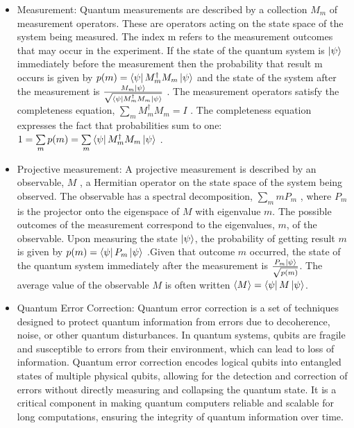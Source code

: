 \documentclass{article}
\begin{document}
\begin{itemize}
			\item Measurement: Quantum measurements are described by a collection ${M_m}$ of measurement operators. These are operators acting on the state space of the  system being measured. The index m refers to the measurement outcomes that may occur in the experiment. If the state of the quantum system is $\ket{\psi}$ immediately before the measurement then the probability that result m occurs is given by $p(m) = \bra{\psi}M_{m}^{\dag}M_{m}\ket{\psi}$ and the state of the system after the measurement is $\frac{M_{m}\ket{\psi}}{\sqrt{\bra{\psi}M_{m}^{\dag}M_{m}\ket{\psi}}}$ . The measurement operators satisfy the completeness equation, $\sum\limits_{m} M_{m}^{\dag}M_{m} = I$ . The completeness equation expresses the fact that probabilities sum to one: $1 = \sum\limits_{m} p(m) = \sum\limits_{m} \bra{\psi}M_{m}^{\dag}M_{m}\ket{\psi}$ . \cite{quantccompquantinfo}
			
			\item Projective measurement: A projective measurement is described by an observable, $M$ , a Hermitian operator on the state space of the system being observed. The observable has a spectral decomposition, $\sum\limits_m mP_m$ , where $P_m$ is the projector onto the eigenspace of $M$ with eigenvalue $m$. The possible outcomes of the measurement correspond to the eigenvalues, $m$, of the observable. Upon measuring the state $\ket{\psi}$, the probability of getting result $m$ is given by $p(m) = \bra{\psi}P_m\ket{\psi}$ .Given that outcome $m$ occurred, the state of the quantum system immediately after the measurement is $\frac{P_m\ket{\psi}}{\sqrt{p(m)}}$. The average value of the observable $M$ is often written $\braket{M} = \bra{\psi}M\ket{\psi}$.\cite{quantccompquantinfo}
			
			\item Quantum Error Correction: Quantum error correction is a set of techniques designed to protect quantum information from errors due to decoherence, noise, or other quantum disturbances. In quantum systems, qubits are fragile and susceptible to errors from their environment, which can lead to loss of information. Quantum error correction encodes logical qubits into entangled states of multiple physical qubits, allowing for the detection and correction of errors without directly measuring and collapsing the quantum state. It is a critical component in making quantum computers reliable and scalable for long computations, ensuring the integrity of quantum information over time.
			

\end{itemize}
\end{document}
